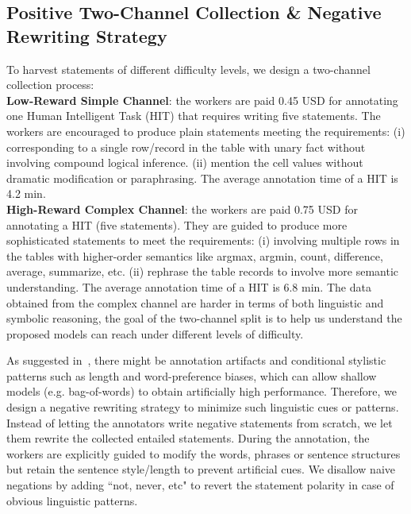 \documentclass{article} \usepackage{iclr2020_conference,times}
\begin{document}
\subsection{Positive Two-Channel Collection \& Negative Rewriting Strategy}
To harvest statements of different difficulty levels, we design a two-channel collection process:\vspace{3px}\\
\noindent \textbf{Low-Reward Simple Channel}: the workers are paid 0.45 USD for annotating one Human Intelligent Task (HIT) that requires writing five statements. The workers are encouraged to produce plain statements meeting the requirements: (i) corresponding to a single row/record in the table with unary fact without involving compound logical inference. (ii) mention the cell values without dramatic modification or paraphrasing. The average annotation time of a HIT is 4.2 min.\vspace{3px}\\
\noindent \textbf{High-Reward Complex Channel}: the workers are paid 0.75 USD for annotating a HIT (five statements). They are guided to produce more sophisticated statements to meet the requirements: (i) involving multiple rows in the tables with higher-order semantics like argmax, argmin, count, difference, average, summarize, etc. (ii) rephrase the table records to involve more semantic understanding. The average annotation time of a HIT is 6.8 min.
The data obtained from the complex channel are harder in terms of both linguistic and symbolic reasoning, the goal of the two-channel split is to help us understand the proposed models can reach under different levels of difficulty.

As suggested in~\citep{zellers2018swag}, there might be annotation artifacts and conditional stylistic patterns such as length and word-preference biases, which can allow shallow models (e.g. bag-of-words) to obtain artificially high performance. Therefore, we design a negative rewriting strategy to minimize such linguistic cues or patterns. Instead of letting the annotators write negative statements from scratch, we let them rewrite the collected entailed statements. During the annotation, the workers are explicitly guided to modify the words, phrases or sentence structures but retain the sentence style/length to prevent artificial cues. We disallow naive negations by adding ``not, never, etc" to revert the statement polarity in case of obvious linguistic patterns.
\end{document}
